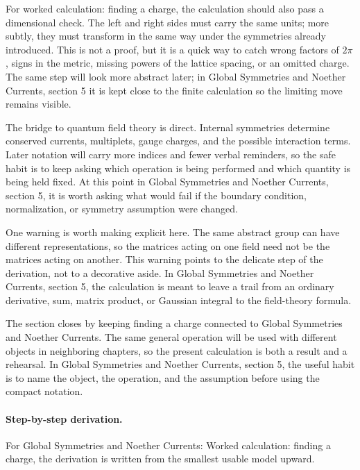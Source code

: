 For worked calculation: finding a charge, the calculation should also pass a dimensional check.  The left and right sides must carry the same units; more subtly, they must transform in the same way under the symmetries already introduced.  This is not a proof, but it is a quick way to catch wrong factors of \(2\pi\), signs in the metric, missing powers of the lattice spacing, or an omitted charge.  The same step will look more abstract later; in Global Symmetries and Noether Currents, section 5 it is kept close to the finite calculation so the limiting move remains visible.

The bridge to quantum field theory is direct.  Internal symmetries determine conserved currents, multiplets, gauge charges, and the possible interaction terms.  Later notation will carry more indices and fewer verbal reminders, so the safe habit is to keep asking which operation is being performed and which quantity is being held fixed.  At this point in Global Symmetries and Noether Currents, section 5, it is worth asking what would fail if the boundary condition, normalization, or symmetry assumption were changed.

One warning is worth making explicit here.  The same abstract group can have different representations, so the matrices acting on one field need not be the matrices acting on another.  This warning points to the delicate step of the derivation, not to a decorative aside.  In Global Symmetries and Noether Currents, section 5, the calculation is meant to leave a trail from an ordinary derivative, sum, matrix product, or Gaussian integral to the field-theory formula.

The section closes by keeping finding a charge connected to Global Symmetries and Noether Currents.  The same general operation will be used with different objects in neighboring chapters, so the present calculation is both a result and a rehearsal.  In Global Symmetries and Noether Currents, section 5, the useful habit is to name the object, the operation, and the assumption before using the compact notation.



\paragraph{Step-by-step derivation.}

For Global Symmetries and Noether Currents: Worked calculation: finding a charge, the derivation is written from the smallest usable model upward.

